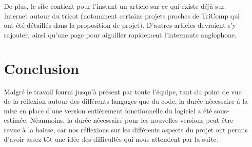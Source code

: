\documentclass{article}
\begin{document}
De plus, le site contient pour l'instant un article sur ce qui existe déjà sur Internet autour du tricot (notamment certains projets
proches de TriComp qui ont été détaillés dans la proposition de projet). D'autres articles devraient s'y rajouter, ainsi qu'une page pour aiguiller
rapidement l'internaute anglophone.

\section{Conclusion}

Malgré le travail fourni jusqu'à présent par toute l'équipe, tant du point de vue de la réflexion autour des différents langages que du code, la durée nécessaire à la mise en place d'une version entièrement fonctionnelle du logiciel a été sous-estimée. Néanmoins, la durée nécessaire pour les nouvelles versions peut être revue à la baisse, car nos réflexions sur les différents aspects du projet ont permis d'avoir assez tôt une idée des difficultés qui nous attendent par la suite.
\end{document}
